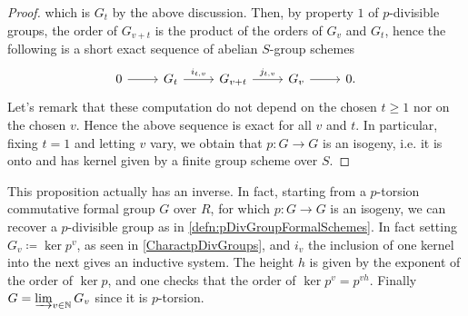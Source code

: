 \documentclass[../Main]{subfiles}
\begin{document}
\begin{proof}
	which is $G_t$ by the above discussion.
	Then, by property $1$ of $p$-divisible groups,
	the order of $G_{v+t}$ is the product of the orders
	of $G_v$ and $G_t$, hence the following is a
	short exact sequence of abelian $S$-group schemes
	\begin{equation*}
	\begin{tikzcd}
		0 \arrow[r, "", rightarrow] &
		G_t \arrow[r, "i_{t,v}", rightarrow] &
		G_{v+t} \arrow[r, "j_{t,v}", rightarrow] &
		G_v \arrow[r, "", rightarrow] &
		0
	.\end{tikzcd}
	\end{equation*}
	Let's remark that these computation do not depend on the chosen $t \geq 1$
	nor on the chosen $v$.
	Hence the above sequence is exact for all $v$ and $t$.
	In particular, fixing $t=1$ and letting $v$ vary,
	we obtain that $p\colon G \to G$ is an isogeny,
	i.e. it is onto and has kernel given by a finite group scheme over $S$.
\end{proof}


\begin{rem}[]
	This proposition actually has an inverse.
	In fact, starting from a $p$-torsion commutative formal group $G$ over
	$R$, for which $p\colon G \to G$ is an isogeny, we can recover a $p$-divisible
	group as in \cref{defn:pDivGroupFormalSchemes}.
	In fact setting $G_v \coloneqq \ker p^v$, as seen in \cref{CharactpDivGroups},
	and $i_v$ the inclusion of one kernel into the next gives an inductive system.
	The height $h$ is given by the exponent of the order of $\ker p$,
	and one checks that the order of $\ker p^v = p^{vh}$.
	Finally $G = \varinjlim_{v \in \mathbb{N}} G_v$ since it is $p$-torsion.
\end{rem}
\end{document}
